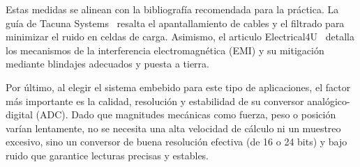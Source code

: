 Estas medidas se alinean con la bibliografía recomendada para la práctica. La
guía de Tacuna Systems~\cite{tacuna_noise} resalta el apantallamiento de cables
y el filtrado para minimizar el ruido en celdas de carga. Asimismo, el articulo
Electrical4U~\cite{electrical4u_emi}
detalla los mecanismos de la interferencia electromagnética (EMI) y su
mitigación mediante blindajes adecuados y puesta a tierra.

Por último, al elegir el sistema embebido para este tipo de aplicaciones, el
factor más importante es la calidad, resolución y estabilidad de su conversor
analógico-digital (ADC). Dado que magnitudes mecánicas como fuerza, peso o
posición varían lentamente, no se necesita una alta velocidad de cálculo ni un
muestreo excesivo, sino un conversor de buena resolución efectiva (de 16 o 24
bits) y bajo ruido que garantice lecturas precisas y estables.

